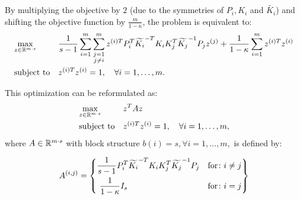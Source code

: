 By multiplying the objective by $2$ (due to the symmetries of $P_i, K_i$ and $\widetilde{K_i}$)
and shifting the objective function by $\frac{m}{1 - \kappa}$, the problem is equivalent to:
\begin{equation}
\begin{aligned}
& \underset{z \in \mathbb{R}^{m\cdot s}}{\text{max}}
& & \frac{1}{s -1} \sum_{i = 1}^m \sum_{\substack{j = 1\\ j\neq i}}^m z^{(i)T} P_i^T \widetilde{K_i}^{-T} K_i K_j^T \widetilde{K_j}^{-1} P_j z^{(j)} + \frac{1}{1-\kappa}\sum_{i = 1}^m z^{(i)T}  z^{(i)}\\
& \text{subject to}
& & z^{(i)T}  z^{(i)} = 1, \quad\forall i = 1,\ldots, m.
\end{aligned}
\end{equation}

This optimization can be reformulated as:
\begin{equation}\label{eq:projZkdimapproxdualqcqp}
\begin{aligned}
& \underset{z \in \mathbb{R}^{m\cdot s}}{\text{max}}
& & z^T A z\\
& \text{subject to}
& & z^{(i)T}  z^{(i)} = 1, \quad\forall i = 1,\ldots, m,
\end{aligned}
\end{equation}
where $A \in \mathbb{R}^{m\cdot s}$ with block structure $b\left(i\right) = s, \forall i = 1,\ldots, m,$ is defined by:

\begin{equation*}
 A^{(i,j)} = \left\{
  \begin{aligned}
  &   \frac{1}{s -1} P_i^T \widetilde{K_i}^{-T} K_i K_j^T \widetilde{K_j}^{-1} P_j  & {\rm for}  \colon i \neq j \\
  &\  \frac{1}{1-\kappa } I_s & {\rm for} \colon i = j
  \end{aligned}
\right\}
\end{equation*}

